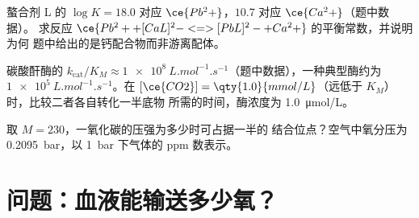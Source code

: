 \begin{exercise}[$\star\star\star$]\label{exo:b3:bioinorganic:10}
螯合剂 L 的 $\log K = 18.0$ 对应 $\ce{Pb^2+}$，$10.7$ 对应 $\ce{Ca^2+}$（题中数据）。
求反应 $\ce{Pb^2+ + [CaL]^2- <=> [PbL]^2- + Ca^2+}$ 的平衡常数，并说明为何
题中给出的是钙配合物而非游离配体。
\end{exercise}

\begin{exercise}[$\star\star\star$]\label{exo:b3:bioinorganic:11}
碳酸酐酶的 $k_{\mathrm{cat}}/K_M \approx \qty{1e8}{L.mol^{-1}.s^{-1}}$（题中数据），一种典型酶约为
$\qty{1e5}{L.mol^{-1}.s^{-1}}$。在 $[\ce{CO2}] = \qty{1.0}{mmol/L}$（远低于 $K_M$）时，比较二者各自转化一半底物
所需的时间，酶浓度为 \qty{1.0}{\micro mol/L}。
\end{exercise}

\begin{exercise}[$\star\star\star$]\label{exo:b3:bioinorganic:12}
取 $M = 230$，一氧化碳的压强为多少时可占据一半的
结合位点？空气中氧分压为 \qty{0.2095}{bar}，以 \qty{1}{bar} 下气体的 ppm 数表示。
\end{exercise}

\section{问题：血液能输送多少氧？}

